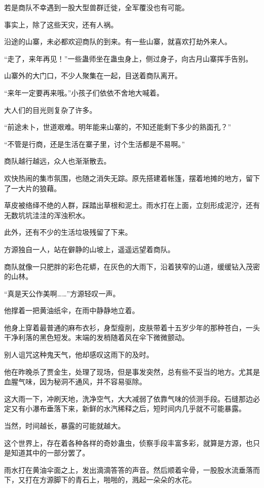 \begin{this_body}
若是商队不幸遇到一股大型兽群迁徙，全军覆没也有可能。

事实上，除了这些天灾，还有人祸。

沿途的山寨，未必都欢迎商队的到来。有一些山寨，就喜欢打劫外来人。

“走了，来年再见！”一些蛊师坐在蛊虫身上，侧过身子，向古月山寨挥手告别。

山寨外的大门口，不少人聚集在一起，目送着商队离开。

“来年一定要再来哦。”小孩子们依依不舍地大喊着。

大人们的目光则复杂了许多。

“前途未卜，世道艰难。明年能来山寨的，不知还能剩下多少的熟面孔？”

“不管是行商，还是生活在寨子里，讨个生活都是不易啊。”

商队越行越远，众人也渐渐散去。

欢快热闹的集市氛围，也随之消失无踪。原先搭建着帐篷，摆着地摊的地方，留下了一大片的狼藉。

草皮被络绎不绝的人群，踩踏出草根和泥土。雨水打在上面，立刻形成泥泞，还有无数坑坑洼洼的浑浊积水。

此外，还有不少的生活垃圾残留了下来。

方源独自一人，站在僻静的山坡上，遥遥远望着商队。

商队就像一只肥胖的彩色花蟒，在灰色的大雨下，沿着狭窄的山道，缓缓钻入茂密的山林。

“真是天公作美啊……”方源轻叹一声。

他撑着一把黄油纸伞，在雨中静静地立着。

他身上穿着最普通的麻布衣衫，身型瘦削，皮肤带着十五岁少年的那种苍白，一头干净利落的黑色短发。末端的发梢随着风在伞下微微颤动。

别人诅咒这种鬼天气，他却感叹这雨下的及时。

他在昨晚杀了贾金生，处理了现场，但是事发突然，总有些不妥当的地方。尤其是血腥气味，因为秘洞不通风，并不容易驱除。

这大雨一下，冲刷天地，洗净空气，大大减弱了依靠气味的侦测手段。石缝那边必定又有小瀑布垂落下来，新鲜的水汽稀释之后，短时间内几乎就不可能暴露。

当然，时间越长，暴露的可能就越大。

这个世界上，存在着各种各样的奇妙蛊虫，侦察手段丰富多彩，就算是方源，也只是知道其中的一部分罢了。

雨水打在黄油伞面之上，发出滴滴答答的声音。然后顺着伞骨，一股股水流垂落而下，又打在方源脚下的青石上，啪啪的，溅起一朵朵的水花。


\end{this_body}
